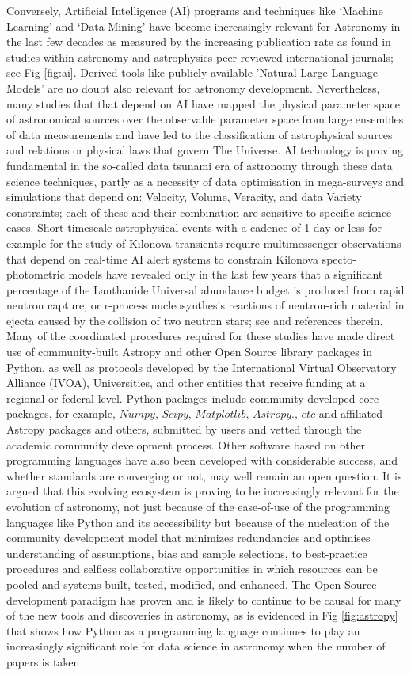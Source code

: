 \documentclass[final,5p,times,twocolumn,authoryear]{elsarticle}
\begin{document}
Conversely, Artificial Intelligence (AI) programs and techniques like `Machine Learning' and `Data Mining' have become increasingly relevant for Astronomy in the last few decades as measured by the increasing publication rate as found in studies within astronomy and astrophysics peer-reviewed international journals; see Fig \ref{fig:ai}.  Derived tools like publicly available 'Natural Large Language Models' are no doubt also relevant for astronomy development. Nevertheless, many studies that that depend on AI have mapped the physical parameter space of astronomical sources over the observable parameter space from large ensembles of data measurements and have led to the classification of astrophysical sources and relations or physical laws that govern The Universe. AI technology is proving fundamental in the so-called data tsunami era of astronomy through these data science techniques, partly as a necessity of data optimisation in mega-surveys and simulations that depend on: Velocity, Volume, Veracity, and data Variety constraints; each of these and their combination are sensitive to specific science cases. Short timescale astrophysical events with a cadence of 1 day or less for example for the study of Kilonova transients require multimessenger observations that depend on real-time AI alert systems to constrain Kilonova specto-photometric models have revealed only in the last few years that a significant percentage of the Lanthanide Universal abundance budget is produced from rapid neutron capture, or r-process nucleosynthesis reactions of neutron-rich material in ejecta caused by the collision of two neutron stars; see \cite{artola2020} and references therein. Many of the coordinated procedures required for these studies have made direct use of community-built Astropy and other Open Source library packages in Python, as well as protocols developed by the International Virtual Observatory Alliance (IVOA), Universities, and other entities that receive funding at a regional or federal level. Python packages include community-developed core packages, for example, $\textit{Numpy, Scipy, Matplotlib, Astropy., etc}$  and affiliated Astropy packages and others, submitted by users and vetted through the academic community development process. Other software based on other programming languages have also been developed with considerable success, and whether standards are converging or not, may well remain an open question. It is argued that this evolving ecosystem is proving to be increasingly relevant for the evolution of astronomy, not just because of the ease-of-use of the programming languages like Python and its accessibility but because of the nucleation of the community development model that minimizes redundancies and optimises understanding of assumptions, bias and sample selections, to best-practice procedures and selfless collaborative opportunities in which resources can be pooled and systems built, tested, modified, and enhanced. The Open Source development paradigm has proven and is likely to continue to be causal for many of the new tools and discoveries in astronomy, as is evidenced in Fig \ref{fig:astropy} that shows how Python as a programming language continues to play an increasingly significant role for data science in astronomy when the number of papers is taken 
\end{document}
